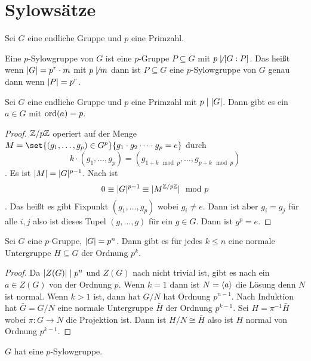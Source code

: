 \section{Sylowsätze}Sei \(G\) eine endliche Gruppe und \(p\) eine Primzahl.
\begin{Def}
    Eine \(p\)-Sylowgruppe von \(G\) ist eine \(p\)-Gruppe \(P\subseteq G\) mit \(p\not\mid[G:P]\). Das heißt wenn \(\lvert G\rvert=p^r\cdot m\) mit \(p\not\mid m\) dann ist \(P\subseteq G\) eine \(p\)-Sylowgruppe von \(G\) genau dann wenn \(\lvert P\rvert=p^r\).
\end{Def}
\begin{Lemma}\label{Lem:CauchyGrp}
    Sei \(G\) eine endliche Gruppe und \(p\) eine Primzahl mit \(p\mid \lvert G\rvert\). Dann gibt es ein \(a\in G\) mit \(\operatorname{ord}(a)=p\).
\end{Lemma}
\begin{proof}
    \(\mathbb{Z}/p\mathbb{Z}\) operiert auf der Menge \(M=\set{(g_1,\dots,g_p)\in G^p}{g_1\cdot g_2\dots \cdot g_p=e}\) durch \[k\cdot (g_1,\dots,g_p)=(g_{1+k\mod p},\dots,g_{p+k\mod p})\]. Es ist \(\lvert M\rvert=\lvert G\rvert ^{p-1}\).
    Nach  ist \[0\equiv \lvert G\rvert^{p-1}\equiv \lvert M^{\mathbb{Z}/p\mathbb{Z}}\rvert\mod p\]. Das heißt es gibt Fixpunkt \((g_1,\dots,g_p)\) wobei \(g_i\neq e\).
    Dann ist aber \(g_i=g_j\) für alle \(i,j\) also ist dieses Tupel \((g,\dots ,g)\) für ein \(g\in G\). Dann ist \(g^p=e\).
\end{proof}
\begin{Kor}\label{Kor:NormIndex}
    Sei \(G\) eine \(p\)-Gruppe, \(\lvert G\rvert=p^n\). Dann gibt es für jedes \(k\leq n\) eine normale Untergruppe \(H\subseteq G\) der Ordnung \(p^k\).
\end{Kor}
\begin{proof}
    Da \(\lvert Z(G)\rvert\mid p^n\) und \(Z(G)\) nach  nicht trivial ist, gibt es nach  ein \(a\in Z(G)\) von der Ordnung \(p\). Wenn \(k=1\) dann ist \(N=\langle a\rangle\) die Lösung denn \(N\) ist normal. Wenn \(k>1\) ist, dann hat \(G/N\) hat Ordnung \(p^{n-1}\). Nach Induktion hat \(\bar G=G/N\) eine normale Untergruppe \(\bar H\) der Ordnung \(p^{k-1}\). Sei \(H=\pi^{-1}\bar H\) wobei \(\pi\colon G\to N\) die Projektion ist. Dann ist \(H/N\cong \bar H\) also ist \(H\) normal von Ordnung \(p^{k-1}\).
\end{proof}
\begin{Satz}[1. Sylowsatz]
    \(G\) hat eine \(p\)-Sylowgruppe.
\end{Satz}
